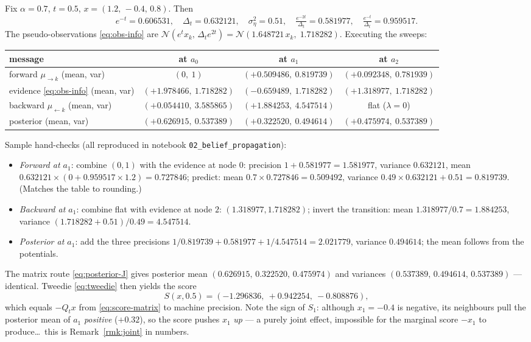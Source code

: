 \documentclass[11pt]{article}
\theoremstyle{definition}
\newcommand{\N}{\mathcal{N}}
\newcommand{\Dt}{\Delta_t}
\newcommand{\Qt}{Q_t}
\begin{document}
Fix $\alpha=0.7$, $t=0.5$, $x=(1.2,\,-0.4,\,0.8)$. Then
\[
  e^{-t}=0.606531,\quad \Dt=0.632121,\quad \sigma_\eta^2=0.51,\quad
  \tfrac{e^{-2t}}{\Dt}=0.581977,\quad \tfrac{e^{-t}}{\Dt}=0.959517 .
\]
The pseudo-observations \eqref{eq:obs-info} are
$\N(e^tx_k,\,\Dt e^{2t})=\N(1.648721\,x_k,\;1.718282)$. Executing the sweeps:

\begin{center}\small
\begin{tabular}{@{}lccc@{}}
\toprule
message & at $a_0$ & at $a_1$ & at $a_2$\\
\midrule
forward $\mu_{\to k}$ (mean, var) & $(0,\ 1)$ & $(+0.509486,\ 0.819739)$ & $(+0.092348,\ 0.781939)$\\
evidence \eqref{eq:obs-info} (mean, var) & $(+1.978466,\ 1.718282)$ & $(-0.659489,\ 1.718282)$ & $(+1.318977,\ 1.718282)$\\
backward $\mu_{\leftarrow k}$ (mean, var) & $(+0.054410,\ 3.585865)$ & $(+1.884253,\ 4.547514)$ & flat ($\lambda=0$)\\
\midrule
posterior (mean, var) & $(+0.626915,\ 0.537389)$ & $(+0.322520,\ 0.494614)$ & $(+0.475974,\ 0.537389)$\\
\bottomrule
\end{tabular}
\end{center}

\noindent Sample hand-checks (all reproduced in notebook
\texttt{02\_belief\_propagation}):
\begin{itemize}[leftmargin=1.6em, itemsep=1pt]
\item \emph{Forward at $a_1$}: combine $(0,1)$ with the evidence at node $0$:
precision $1+0.581977=1.581977$, variance $0.632121$, mean
$0.632121\times(0+0.959517\times1.2)=0.727846$; predict:
mean $0.7\times0.727846=0.509492$, variance
$0.49\times0.632121+0.51=0.819739$. \;(Matches the table to rounding.)
\item \emph{Backward at $a_1$}: combine flat with evidence at node $2$:
$(1.318977,1.718282)$; invert the transition: mean $1.318977/0.7=1.884253$,
variance $(1.718282+0.51)/0.49=4.547514$. \;\checkmark
\item \emph{Posterior at $a_1$}: add the three precisions
$1/0.819739+0.581977+1/4.547514=2.021779$, variance $0.494614$; the mean
follows from the potentials. \;\checkmark
\end{itemize}
The matrix route \eqref{eq:posterior-J} gives posterior mean
$(0.626915,\,0.322520,\,0.475974)$ and variances
$(0.537389,\,0.494614,\,0.537389)$ --- identical. Tweedie
\eqref{eq:tweedie} then yields the score
\[
  S(x,0.5)=(-1.296836,\ +0.942254,\ -0.808876),
\]
which equals $-\Qt x$ from \eqref{eq:score-matrix} to machine precision.
Note the sign of $S_1$: although $x_1=-0.4$ is negative, its neighbours pull
the posterior mean of $a_1$ \emph{positive} ($+0.32$), so the score pushes
$x_1$ \emph{up} --- a purely joint effect, impossible for the marginal score
$-x_1$ to produce\ldots\ this is Remark~\ref{rmk:joint} in numbers.
\end{document}

